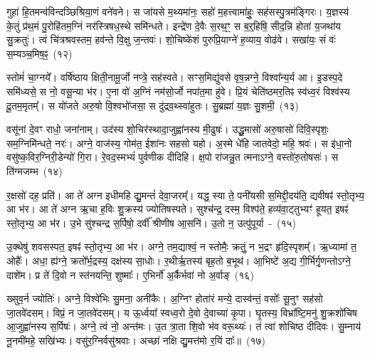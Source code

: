 गुहा॑ हि॒तमन्व॑विन्दञ्छिश्रिया॒णं वने॑वने। स जा॑यसे म॒थ्यमा॑नः॒ सहो॑ म॒हत्त्वामा॑हुः॒ सह॑सस्पु॒त्रम॑ङ्गिरः। य॒ज्ञस्य॑ के॒तुं प्र॑थ॒मं पु॒रोहि॑तम॒ग्निं नर॑स्त्रिषध॒स्थे समि॑न्धते। इन्द्रे॑ण दे॒वैः स॒रथ॒ꣳ॒ स ब॒र्॒\mbox{}हिषि॒ सीद॒न्नि होता॑ य॒जथा॑य सु॒क्रतुः॑। त्वं चि॑त्रश्रवस्तम॒ हव॑न्ते वि॒क्षु ज॒न्तवः॑। शो॒चिष्के॑शं पुरुप्रि॒याग्ने॑ ह॒व्याय॒ वोढ॑वे। सखा॑यः॒ सं वः॑ स॒म्यञ्च॒मिष॒ꣴ॒~(१२)\ip

स्तोमं॑ चा॒ग्नये᳚। वर्\mbox{}षि॑ष्ठाय क्षिती॒नामू॒र्जो नप्त्रे॒ सह॑स्वते। सꣳस॒मिद्यु॑वसे वृष॒न्नग्ने॒ विश्वा᳚न्य॒र्य आ। इ॒डस्प॒दे समि॑ध्यसे॒ स नो॒ वसू॒न्या भ॑र। ए॒ना वो॑ अ॒ग्निं नम॑सो॒र्जो नपा॑त॒मा हु॑वे। प्रि॒यं चेति॑ष्ठमर॒तिꣴ स्व॑ध्व॒रं विश्व॑स्य दू॒तम॒मृतम्᳚। स यो॑जते अरु॒षो वि॒श्वभो॑जसा॒ स दु॑द्रव॒थ्\-स्वा॑हुतः। सु॒ब्रह्मा॑ य॒ज्ञः सु॒शमी॒~(१३)\ip

वसू॑नां दे॒वꣳ राधो॒ जना॑नाम्। उद॑स्य शो॒चिर॑स्थादा॒जुह्वा॑नस्य मी॒ढुषः॑। उद्धू॒मासो॑ अरु॒षासो॑ दिवि॒स्पृशः॒ सम॒ग्निमि॑न्धते॒ नरः॑। अग्ने॒ वाज॑स्य॒ गोम॑त॒ ईशा॑नः सहसो यहो। अ॒स्मे धे॑हि जातवेदो॒ महि॒ श्रवः॑। स इ॑धा॒नो वसु॑ष्क॒विर॒ग्निरी॒डेन्यो॑ गि॒रा। रे॒वद॒स्मभ्यं॑ पुर्वणीक दीदिहि। क्ष॒पो रा॑जन्नु॒त त्मनाऽग्ने॒ वस्तो॑रु॒तोषसः॑। स ति॑ग्मजम्भ~(१४)\ip

र॒क्षसो॑ दह॒ प्रति॑। आ ते॑ अग्न इधीमहि द्यु॒मन्तं॑ देवा॒जरम्᳚। यद्ध॒ स्या ते॒ पनी॑यसी स॒मिद्दी॒दय॑ति॒ द्यवीषꣴ॑ स्तो॒तृभ्य॒ आ भ॑र। आ ते॑ अग्न ऋ॒चा ह॒विः शु॒क्रस्य॑ ज्योतिषस्पते। सुश्च॑न्द्र॒ दस्म॒ विश्प॑ते॒ हव्य॑वा॒ट्तुभ्यꣳ॑ हूयत॒ इषꣴ॑ स्तो॒तृभ्य॒ आ भ॑र। उ॒भे सु॑श्चन्द्र स॒र्पिषो॒ दर्वी᳚ श्रीणीष आ॒सनि॑। उ॒तो न॒ उत्पु॑पूर्या~-~(१५)\ip

उ॒क्थेषु॑ शवसस्पत॒ इषꣴ॑ स्तो॒तृभ्य॒ आ भ॑र। अग्ने॒ तम॒द्याश्वं॒ न स्तोमैः॒ क्रतुं॒ न भ॒द्रꣳ हृ॑दि॒स्पृशम्᳚। ऋ॒ध्यामा॑ त॒ ओहैः᳚। अधा॒ ह्य॑ग्ने॒ क्रतो᳚र्भ॒द्रस्य॒ दक्ष॑स्य सा॒धोः। र॒थीर्\mbox{}ऋ॒तस्य॑ बृह॒तो ब॒भूथ॑। आ॒भिष्टे॑ अ॒द्य गी॒र्भिर्गृ॒णन्तो\-ऽग्ने॒ दाशे॑म। प्र ते॑ दि॒वो न स्त॑नयन्ति॒ शुष्माः᳚। ए॒भिर्नो॑ अ॒र्कैर्भवा॑ नो अ॒र्वाङ्~(१६)\ip

ख्सुव॒र्न ज्योतिः॑। अग्ने॒ विश्वे॑भिः सु॒मना॒ अनी॑कैः। अ॒ग्निꣳ होता॑रं मन्ये॒ दास्व॑न्तं॒ वसोः᳚ सू॒नुꣳ सह॑सो जा॒तवे॑दसम्। विप्रं॒ न जा॒तवे॑दसम्। य ऊ॒र्ध्वया᳚ स्वध्व॒रो दे॒वो दे॒वाच्या॑ कृ॒पा। घृ॒तस्य॒ विभ्रा᳚ष्टि॒मनु॑ शु॒क्रशो॑चिष आ॒जुह्वा॑नस्य स॒र्पिषः॑। अग्ने॒ त्वं नो॒ अन्त॑मः। उ॒त त्रा॒ता शि॒वो भ॑व वरू॒थ्यः॑। तं त्वा॑ शोचिष्ठ दीदिवः। सु॒म्नाय॑ नू॒नमी॑महे॒ सखि॑भ्यः। वसु॑र॒ग्निर्वसु॑श्रवाः। अच्छा॑ नक्षि द्यु॒मत्त॑मो र॒यिं दाः᳚॥~(१७)\ip

{}

